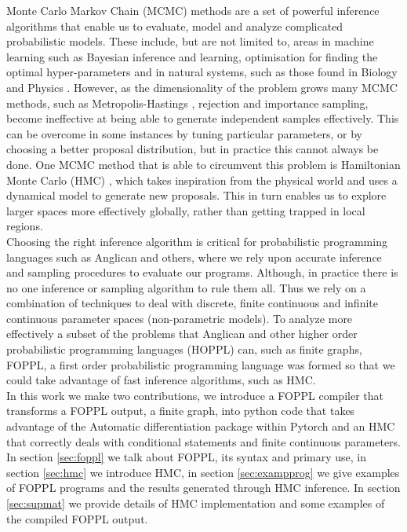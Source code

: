 \documentclass[twoside]{article}
\begin{document}
Monte Carlo Markov Chain (MCMC) methods are a set of powerful inference algorithms \citep{berg2008markov} that enable us to evaluate, model and analyze complicated probabilistic models. These include, but are not limited to, areas in machine learning such as Bayesian inference and learning, optimisation for finding the optimal hyper-parameters \citep{andrieu2003introduction} and in natural systems, such as those found in Biology \citep{sorensen2007likelihood} and Physics \citep{duane1987hybrid}. 
However, as the dimensionality of the problem grows many MCMC methods, such as Metropolis-Hastings \citep{hastings1970monte}, rejection and importance sampling,  become ineffective at being able to generate independent samples effectively. This can be overcome in some instances by tuning particular parameters, or by choosing a better proposal distribution, but in practice this cannot always be done. One MCMC method that is able to circumvent this problem is Hamiltonian Monte Carlo (HMC) \citep{neal2011mcmc}\citep{duane1987hybrid}, which takes inspiration from the physical world and uses a dynamical model to generate new proposals. This in turn enables us to explore larger spaces more effectively globally, rather than getting trapped in local regions. \\
Choosing the right inference algorithm is critical for probabilistic programming languages \citep{tolpin2015probabilistic} such as Anglican \citep{wood2014new} and others, where we rely upon accurate inference and sampling procedures to evaluate our programs. Although, in practice there is no one inference or sampling algorithm to rule them all. Thus we rely on a combination of techniques to deal with discrete, finite continuous and infinite continuous parameter spaces (non-parametric models). To analyze more effectively a subset of the problems that Anglican and other higher order probabilistic programming languages (HOPPL) can, such as finite graphs, FOPPL, a first order probabilistic programming language was formed so that we could take advantage of fast inference algorithms, such as HMC.\\
In this work we make two contributions, we introduce a FOPPL compiler that transforms a FOPPL output, a finite graph, into python code that takes advantage of the Automatic differentiation package within Pytorch \citep{pytorch} and an HMC that correctly deals with conditional statements and finite continuous parameters.
In section \ref{sec:foppl} we talk about FOPPL, its syntax and primary use, in section \ref{sec:hmc} we introduce HMC, in section \ref{sec:exampprog} we give examples of FOPPL programs and the results generated through HMC inference. In section \ref{sec:supmat} we provide details of HMC implementation and some examples of the compiled FOPPL output. 
\end{document}
